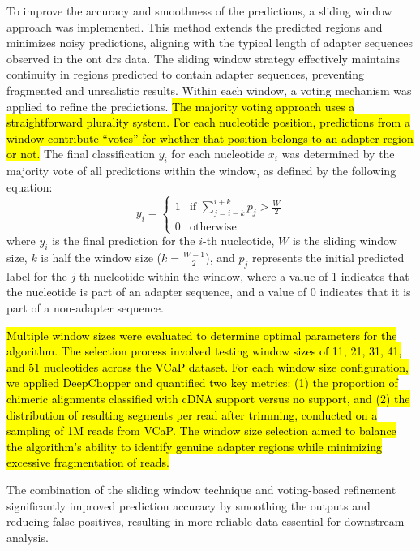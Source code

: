 \documentclass[pdflatex,sn-nature, lineno]{sn-jnl}%
\begin{document}
To improve the accuracy and smoothness of the predictions, a sliding window approach was implemented.
This method extends the predicted regions and minimizes noisy predictions, aligning with the typical length of adapter sequences observed in the \gls{ont} \gls{drs} data.
The sliding window strategy effectively maintains continuity in regions predicted to contain adapter sequences, preventing fragmented and unrealistic results.
Within each window, a voting mechanism was applied to refine the predictions.
\hl{The majority voting approach uses a straightforward plurality system.
	For each nucleotide position, predictions from a window contribute ``votes'' for whether that position belongs to an adapter region or not.}
The final classification $y_i$ for each nucleotide \( x_i \) was determined by the majority vote of all predictions within the window, as defined by the following equation:
\[
	y_i = \begin{cases}
		1 & \text{if } \sum_{j=i-k}^{i+k} p_j > \frac{W}{2} \\
		0 & \text{otherwise}
	\end{cases}
\]
where \(y_i\) is the final prediction for the $i$-th nucleotide, \( W \) is the sliding window size, \( k \) is half the window size (\( k = \frac{W-1}{2}\)), and  \(p_j\) represents the initial predicted label for the \(j\)-th nucleotide within the window, where a value of 1 indicates that the nucleotide is part of an adapter sequence, and a value of 0 indicates that it is part of a non-adapter sequence.



\hl{Multiple window sizes were evaluated to determine optimal parameters for the algorithm.
	The selection process involved testing window sizes of 11, 21, 31, 41, and 51 nucleotides across the VCaP dataset.
	For each window size configuration, we applied DeepChopper and quantified two key metrics: (1) the proportion of chimeric alignments classified with cDNA support versus no support, and (2) the distribution of resulting segments per read after trimming, conducted on a sampling of 1M reads from VCaP.
	The window size selection aimed to balance the algorithm's ability to identify genuine adapter regions while minimizing excessive fragmentation of reads.}

The combination of the sliding window technique and voting-based refinement significantly improved prediction accuracy by smoothing the outputs and reducing false positives, resulting in more reliable data essential for downstream analysis.
\end{document}
